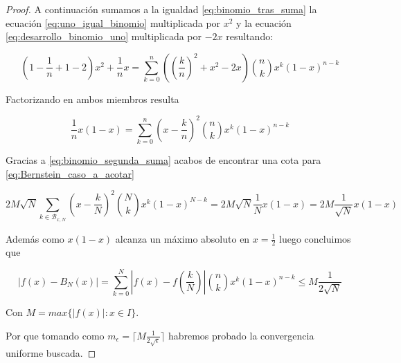 \begin{proof}
  A continuación sumamos a la igualdad \eqref{eq:binomio_tras_suma} la ecuación \eqref{eq:uno_igual_binomio} multiplicada por $x^2$ y la ecuación \eqref{eq:desarrollo_binomio_uno}
  multiplicada por $-2x$ resultando: 


  \begin{equation} 
    (1 - \frac{1}{n} + 1 -2)  x^2 + \frac{1}{n}x= \sum_{k=0}^{n} \left( \left( \frac{k}{n} \right)^2 + x^2 -2x \right) \binom{n}{k} x^{k} (1-x)^{n-k}
  \end{equation}

  Factorizando en ambos miembros resulta

  \begin{equation} \label{eq:binomio_segunda_suma}
     \frac{1}{n} x (1-x)= \sum_{k=0}^{n}  \left( x-\frac{k}{n} \right)^2  \binom{n}{k} x^{k} (1-x)^{n-k}
  \end{equation}

  Gracias a \eqref{eq:binomio_segunda_suma} acabos de encontrar una cota para 
  \eqref{eq:Bernstein_caso_a_acotar}

  \begin{equation}
    2M \sqrt{N} \sum_{k \in \mathcal{B}_{x,N}}  (x- \frac{k}{N})^2 \binom{N}{k} x^k (1-x) ^{N-k}  = 2M \sqrt{N} \frac{1}{N} x (1-x) = 2M  \frac{1}{\sqrt{N}} x (1-x)
  \end{equation}

  Además como $x (1-x)$ alcanza un máximo absoluto en $x=\frac{1}{2}$ luego concluimos que 

  \begin{equation}
    |f(x)-B_N(x)| = \sum_{k=0}^N \left| f(x) - f \left(\frac{k}{N} \right) \right| \binom{n}{k} x^k (1-x) ^{n-k} \leq M \frac{1}{2 \sqrt{N}} 
\end{equation}

    Con $M = max \{ |f(x)| : x \in I\}.$

    Por que tomando como $m_\epsilon = \lceil M \frac{1}{2 \sqrt{ \epsilon }} \rceil$
    habremos probado la convergencia uniforme buscada. 

\end{proof}

 
 
\endinput 


Sin pérdida de generalidad supondremos que $I=[0,1]$, como veremos esto no es restrictivo ya que 
si $I$ fuera un intervalo cerrado existiría un homeomorfismo $H$ tal que $H^*(I)=[0,1]$ y podríamos
trabajar con $H \circ f$ la cual respetaría todas los argumentos utilizados en la demostración. 

